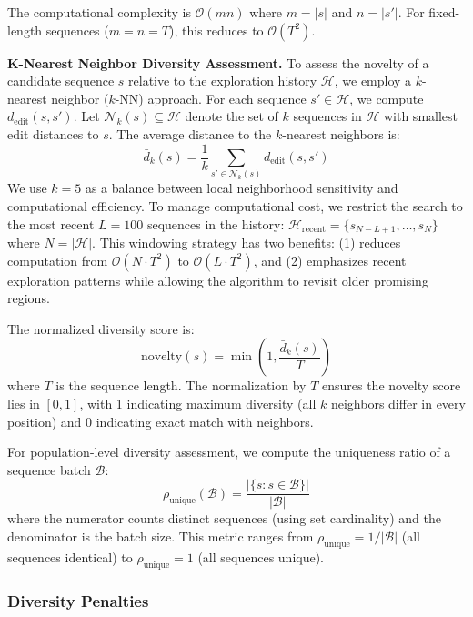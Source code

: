 \documentclass[conference]{IEEEtran}
\begin{document}
The computational complexity is $\mathcal{O}(mn)$ where $m = |s|$ and $n = |s'|$. For fixed-length sequences ($m = n = T$), this reduces to $\mathcal{O}(T^2)$.

\textbf{K-Nearest Neighbor Diversity Assessment.} To assess the novelty of a candidate sequence $s$ relative to the exploration history $\mathcal{H}$, we employ a $k$-nearest neighbor ($k$-NN) approach. For each sequence $s' \in \mathcal{H}$, we compute $d_{\text{edit}}(s, s')$. Let $\mathcal{N}_k(s) \subseteq \mathcal{H}$ denote the set of $k$ sequences in $\mathcal{H}$ with smallest edit distances to $s$. The average distance to the $k$-nearest neighbors is:
%
\begin{equation}
\bar{d}_k(s) = \frac{1}{k}\sum_{s' \in \mathcal{N}_k(s)} d_{\text{edit}}(s, s')
\end{equation}
%
We use $k = 5$ as a balance between local neighborhood sensitivity and computational efficiency. To manage computational cost, we restrict the search to the most recent $L = 100$ sequences in the history: $\mathcal{H}_{\text{recent}} = \{s_{N-L+1}, \ldots, s_N\}$ where $N = |\mathcal{H}|$. This windowing strategy has two benefits: (1) reduces computation from $\mathcal{O}(N \cdot T^2)$ to $\mathcal{O}(L \cdot T^2)$, and (2) emphasizes recent exploration patterns while allowing the algorithm to revisit older promising regions.

The normalized diversity score is:
%
\begin{equation}
\text{novelty}(s) = \min\left(1, \frac{\bar{d}_k(s)}{T}\right)
\end{equation}
%
where $T$ is the sequence length. The normalization by $T$ ensures the novelty score lies in $[0, 1]$, with 1 indicating maximum diversity (all $k$ neighbors differ in every position) and 0 indicating exact match with neighbors.

For population-level diversity assessment, we compute the uniqueness ratio of a sequence batch $\mathcal{B}$:
%
\begin{equation}
\rho_{\text{unique}}(\mathcal{B}) = \frac{|\{s : s \in \mathcal{B}\}|}{|\mathcal{B}|}
\end{equation}
%
where the numerator counts distinct sequences (using set cardinality) and the denominator is the batch size. This metric ranges from $\rho_{\text{unique}} = 1/|\mathcal{B}|$ (all sequences identical) to $\rho_{\text{unique}} = 1$ (all sequences unique).

\subsubsection{Diversity Penalties}
\end{document}
